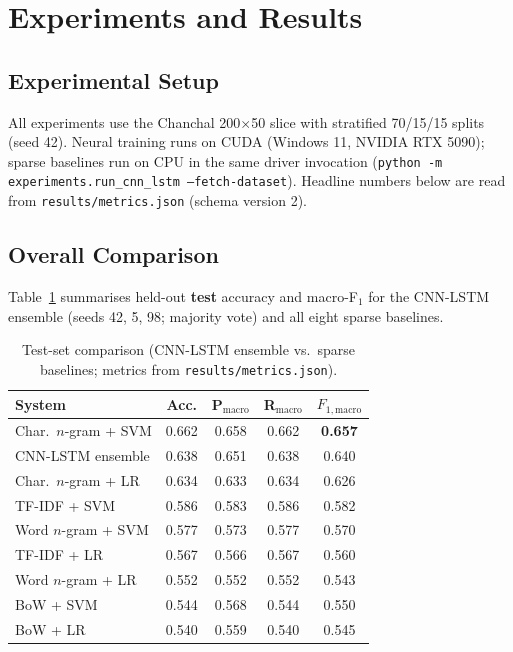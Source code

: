 \documentclass[11pt]{article}
\begin{document}
\section{Experiments and Results}
\label{sec:experiments}

\subsection{Experimental Setup}

All experiments use the Chanchal 200$\times$50 slice with stratified 70/15/15 splits (seed 42).
Neural training runs on CUDA (Windows 11, NVIDIA RTX 5090); sparse baselines run on CPU in the same driver invocation (\texttt{python -m experiments.run\_cnn\_lstm --fetch-dataset}).
Headline numbers below are read from \texttt{results/metrics.json} (schema version 2).

\subsection{Overall Comparison}

Table~\ref{tab:main-results} summarises held-out \textbf{test} accuracy and macro-F$_1$ for the CNN-LSTM ensemble (seeds 42, 5, 98; majority vote) and all eight sparse baselines.

\begin{table}[!bt]
  \centering
  \footnotesize
  \setlength{\tabcolsep}{4pt}
  \begin{tabular}{lcccc}
    \hline
    \textbf{System} & \textbf{Acc.} & \textbf{P$_{\mathrm{macro}}$} & \textbf{R$_{\mathrm{macro}}$} & \textbf{$F_{1,\mathrm{macro}}$} \\
    \hline
    Char.\ $n$-gram + SVM & 0.662 & 0.658 & 0.662 & \textbf{0.657} \\
    CNN-LSTM ensemble & 0.638 & 0.651 & 0.638 & 0.640 \\
    Char.\ $n$-gram + LR & 0.634 & 0.633 & 0.634 & 0.626 \\
    TF-IDF + SVM & 0.586 & 0.583 & 0.586 & 0.582 \\
    Word $n$-gram + SVM & 0.577 & 0.573 & 0.577 & 0.570 \\
    TF-IDF + LR & 0.567 & 0.566 & 0.567 & 0.560 \\
    Word $n$-gram + LR & 0.552 & 0.552 & 0.552 & 0.543 \\
    BoW + SVM & 0.544 & 0.568 & 0.544 & 0.550 \\
    BoW + LR & 0.540 & 0.559 & 0.540 & 0.545 \\
    \hline
  \end{tabular}
  \caption{Test-set comparison (CNN-LSTM ensemble vs.\ sparse baselines; metrics from \texttt{results/metrics.json}).}
  \label{tab:main-results}
\end{table}
\end{document}

